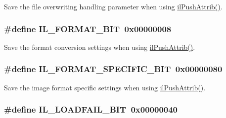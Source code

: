 Save the file overwriting handling parameter when using \hyperlink{group__state_ga72e0879c71f59f06c35d2e2a10191fa8}{il\+Push\+Attrib()}. 

\hypertarget{group__il__bits_gaf7ab93385f9420ef2d016a99525a84a4}{
\subsubsection[{I\+L\+\_\+\+F\+O\+R\+M\+A\+T\+\_\+\+B\+I\+T}]{\setlength{\rightskip}{0pt plus 5cm}\#define I\+L\+\_\+\+F\+O\+R\+M\+A\+T\+\_\+\+B\+I\+T~0x00000008}}\label{group__il__bits_gaf7ab93385f9420ef2d016a99525a84a4}


Save the format conversion settings when using \hyperlink{group__state_ga72e0879c71f59f06c35d2e2a10191fa8}{il\+Push\+Attrib()}. 

\hypertarget{group__il__bits_ga9125bfe8022a62dbe57cf71f28075c2b}{
\subsubsection[{I\+L\+\_\+\+F\+O\+R\+M\+A\+T\+\_\+\+S\+P\+E\+C\+I\+F\+I\+C\+\_\+\+B\+I\+T}]{\setlength{\rightskip}{0pt plus 5cm}\#define I\+L\+\_\+\+F\+O\+R\+M\+A\+T\+\_\+\+S\+P\+E\+C\+I\+F\+I\+C\+\_\+\+B\+I\+T~0x00000080}}\label{group__il__bits_ga9125bfe8022a62dbe57cf71f28075c2b}


Save the image format specific settings when using \hyperlink{group__state_ga72e0879c71f59f06c35d2e2a10191fa8}{il\+Push\+Attrib()}. 

\hypertarget{group__il__bits_gaebba84887b58c8e2152774624b850a5f}{
\subsubsection[{I\+L\+\_\+\+L\+O\+A\+D\+F\+A\+I\+L\+\_\+\+B\+I\+T}]{\setlength{\rightskip}{0pt plus 5cm}\#define I\+L\+\_\+\+L\+O\+A\+D\+F\+A\+I\+L\+\_\+\+B\+I\+T~0x00000040}}\label{group__il__bits_gaebba84887b58c8e2152774624b850a5f}


